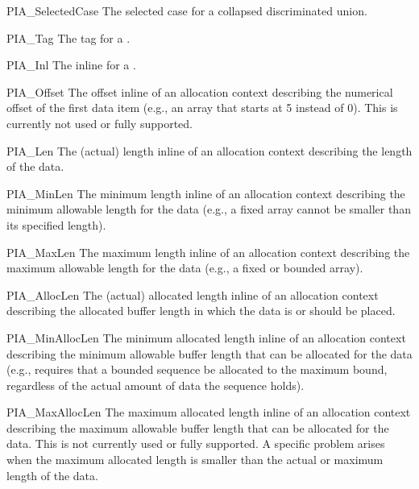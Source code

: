 \begin{cprototypelist}
\begin{cidentifierlist}
    \item[PIA_SelectedCase]  The selected
    case for a collapsed discriminated union.

    \item[PIA_Tag]  The tag for a
    .

    \item[PIA_Inl]  The inline for a
    .

    \item[PIA_Offset]  The offset inline
    of an allocation context describing the numerical offset of the first data
    item (e.g., an array that starts at 5 instead of 0).  This is currently not
    used or fully supported.

    \item[PIA_Len]  The (actual) length
    inline of an allocation context describing the length of the data.

    \item[PIA_MinLen]  The minimum length
    inline of an allocation context describing the minimum allowable length for
    the data (e.g., a fixed array cannot be smaller than its specified length).

    \item[PIA_MaxLen]  The maximum length
    inline of an allocation context describing the maximum allowable length for
    the data (e.g., a fixed or bounded array).

    \item[PIA_AllocLen]  The (actual)
    allocated length inline of an allocation context describing the allocated
    buffer length in which the data is or should be placed.

    \item[PIA_MinAllocLen]  The minimum
    allocated length inline of an allocation context describing the minimum
    allowable buffer length that can be allocated for the data (e.g., \CORBA{}
    requires that a bounded sequence be allocated to the maximum bound,
    regardless of the actual amount of data the sequence holds).

    \item[PIA_MaxAllocLen]  The maximum
    allocated length inline of an allocation context describing the maximum
    allowable buffer length that can be allocated for the data.  This is not
    currently used or fully supported.  A specific problem arises when the
    maximum allocated length is smaller than the actual or maximum length of
    the data.


\end{cidentifierlist}
\end{cprototypelist}
